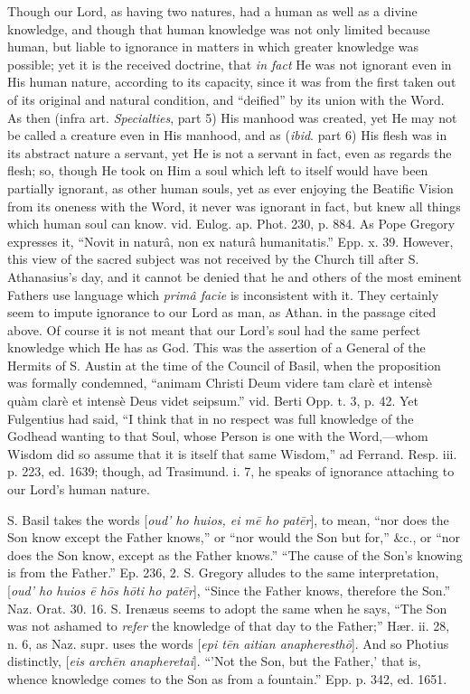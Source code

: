 Though our Lord, as having two natures, had a
human as well as a divine knowledge, and though that human knowledge
was not only limited because human, but liable to ignorance in matters
in which greater knowledge was possible; yet it is the received
doctrine, that \emph{in fact} He was not ignorant even in His human
nature, according to its capacity, since it was from the first taken
out of its original and natural condition, and ``deified'' by its
union with the Word. As then (infra art. \emph{Specialties}, part 5)
His manhood was created, yet He may not be called a creature even in
His manhood, and as (\emph{ibid}. part 6) His flesh was in its
abstract nature a servant, yet He is not a servant in fact, even as
regards the flesh; so, though He took on Him a soul which left to
itself would have been partially ignorant, as other human souls, yet
as ever enjoying the Beatific Vision from its oneness with the Word,
it never was ignorant in fact, but knew all things which human soul
can know. vid. Eulog. ap. Phot. 230, p. 884. As Pope Gregory expresses
it, ``Novit in naturâ, non ex naturâ humanitatis.'' Epp. x. 39.
However, this view of the sacred subject was not received by the
Church till after S. Athanasius's day, and it cannot be denied that
he and others of the most eminent Fathers use language which \emph{primâ
facie} is inconsistent with it. They certainly seem to impute
ignorance to our Lord as man, as Athan. in the passage cited above. Of
course it is not meant that our Lord's soul had the same perfect
knowledge which He has as God. This was the assertion of a General of
the Hermits of S. Austin at the time of the Council of Basil, when the
proposition was formally condemned, ``animam Christi Deum videre tam
clarè et intensè quàm clarè et intensè Deus videt seipsum.'' vid.
Berti Opp. t. 3, p. 42. Yet Fulgentius had said, ``I think that in no
respect was full knowledge of the Godhead wanting to that Soul, whose
Person is one with the Word,—whom Wisdom did so assume that it is
itself that same Wisdom,'' ad Ferrand. Resp. iii. p. 223, ed. 1639;
though, ad Trasimund. i. 7, he speaks of ignorance attaching to our
Lord's human nature.

S. Basil takes the words [\emph{oud'
ho huios, ei m\={e} ho pat\={e}r}], to mean, ``nor does the
Son know except the Father knows,'' or ``nor would the Son but
for,'' \&c., or ``nor does the Son know, except as the Father
knows.'' ``The cause of the Son's knowing is from the Father.'' Ep. 236, 2. S. Gregory alludes to the same interpretation, [\emph{oud' ho huios \={e} h\={o}s h\={o}ti ho pat\={e}r}],
``Since the Father knows, therefore the Son.'' Naz. Orat. 30.
16. S. Irenæus seems to adopt the same when he says, ``The Son was
not ashamed to \emph{refer} the knowledge of that day to the
Father;'' Hær. ii. 28, n. 6, as Naz. supr. uses the words [\emph{epi t\={e}n
aitian anapheresth\={o}}]. And so Photius distinctly, [\emph{eis
arch\={e}n anapheretai}]. ``'Not the Son, but the Father,' that
is, whence knowledge comes to the Son as from a fountain.'' Epp.
p. 342, ed. 1651.

